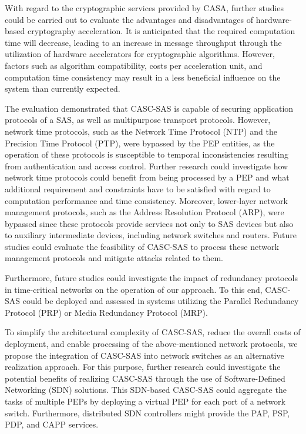 With regard to the cryptographic services provided by CASA, further studies could be carried out to evaluate the advantages and disadvantages of hardware-based cryptography acceleration.
It is anticipated that the required computation time will decrease, leading to an increase in message throughput through the utilization of hardware accelerators for cryptographic algorithms.
However, factors such as algorithm compatibility, costs per acceleration unit, and computation time consistency may result in a less beneficial influence on the system than currently expected.

The evaluation demonstrated that CASC-SAS is capable of securing application protocols of a SAS, as well as multipurpose transport protocols.
However, network time protocols, such as the Network Time Protocol (NTP) and the Precision Time Protocol (PTP), were bypassed by the PEP entities, as the operation of these protocols is susceptible to temporal inconsistencies resulting from authentication and access control.
Further research could investigate how network time protocols could benefit from being processed by a PEP and what additional requirement and constraints have to be satisfied with regard to computation performance and time consistency.
Moreover, lower-layer network management protocols, such as the Address Resolution Protocol (ARP), were bypassed since these protocols provide services not only to SAS devices but also to auxiliary intermediate devices, including network switches and routers.
Future studies could evaluate the feasibility of CASC-SAS to process these network management protocols and mitigate attacks related to them.

Furthermore, future studies could investigate the impact of redundancy protocols in time-critical networks on the operation of our approach.
To this end, CASC-SAS could be deployed and assessed in systems utilizing the Parallel Redundancy Protocol (PRP) or Media Redundancy Protocol (MRP).

To simplify the architectural complexity of CASC-SAS, reduce the overall costs of deployment, and enable processing of the above-mentioned network protocols, we propose the integration of CASC-SAS into network switches as an alternative realization approach.
For this purpose, further research could investigate the potential benefits of realizing CASC-SAS through the use of Software-Defined Networking (SDN) solutions.
This SDN-based CASC-SAS could aggregate the tasks of multiple PEPs by deploying a virtual PEP for each port of a network switch.
Furthermore, distributed SDN controllers might provide the PAP, PSP, PDP, and CAPP services.

